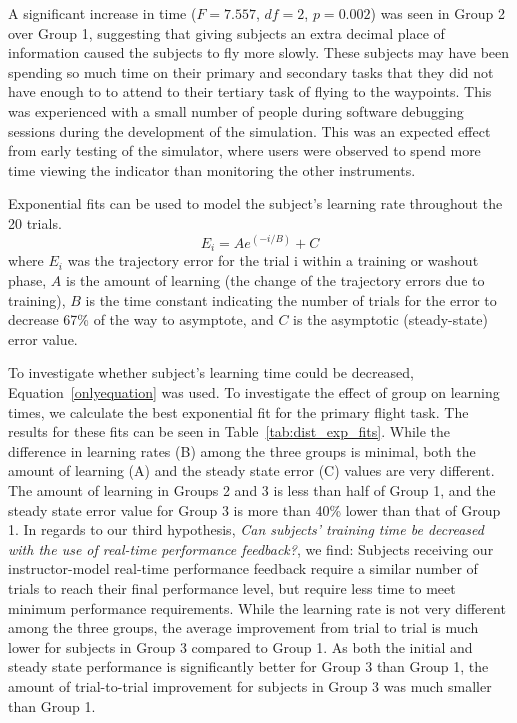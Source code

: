 \documentclass[]{aiaa-tc}%
\begin{document}
A significant increase in time ($F=7.557$, $df = 2$, $p = 0.002$) was seen in Group 2 over Group 1, suggesting that giving subjects an extra decimal place of information caused the subjects to fly more slowly. These subjects may have been spending so much time on their primary and secondary tasks that they did not have enough to to attend to their tertiary task of flying to the waypoints. This was experienced with a small number of people during software debugging sessions during the development of the simulation. %
This was an expected effect from early testing of the simulator, where users were observed to spend more time viewing the indicator than monitoring the other instruments.

Exponential fits can be used to model the subject's learning rate throughout the 20 trials.\begin{equation}
E_i = A e^{(-i/B)} + C
\label{onlyequation}
\end{equation}
where $E_i$ was the trajectory error for the trial i within a training or washout phase, $A$ is the amount of learning (the change of the trajectory errors due to training), $B$ is the time constant indicating the number of trials for the error to decrease 67\% of the way to asymptote, and $C$ is the asymptotic (steady-state) error value.

To investigate whether subject's learning time could be decreased, Equation~\ref{onlyequation} was used. To investigate the effect of group on learning times, we calculate the best exponential fit for the primary flight task. The results for these fits can be seen in Table~\ref{tab:dist_exp_fits}. While the difference in learning rates (B) among the three groups is minimal, both the amount of learning (A) and the steady state error (C) values are very different. The amount of learning in Groups 2 and 3 is less than half of Group 1, and the steady state error value for Group 3 is more than 40\% lower than that of Group 1. In regards to our third hypothesis, \textit{Can subjects' training time be decreased with the use of real-time performance feedback?}, we find: Subjects receiving our instructor-model real-time performance feedback require a similar number of trials to reach their final performance level, but require less time to meet minimum performance requirements. While the learning rate is not very different among the three groups, the average improvement from trial to trial is much lower for subjects in Group 3 compared to Group 1. As both the initial and steady state performance is significantly better for Group 3 than Group 1, the amount of trial-to-trial improvement for subjects in Group 3 was much smaller than Group 1.
\end{document}
